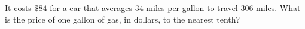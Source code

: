 It costs $\$84$ for a car that averages $34$ miles per gallon to travel $306$ miles. What is the price of one gallon of gas, in dollars, to the nearest tenth?
